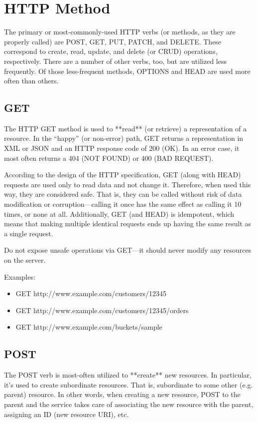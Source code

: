 \documentclass{report}
\begin{document}
	\section{HTTP Method}
	\par The primary or most-commonly-used HTTP verbs (or methods, as they are properly called) are POST, GET, PUT, PATCH, and DELETE. These correspond to create, read, update, and delete (or CRUD) operations, respectively. There are a number of other verbs, too, but are utilized less frequently. Of those less-frequent methods, OPTIONS and HEAD are used more often than others.
	\subsection{GET}
	\par 
	
	The HTTP GET method is used to **read** (or retrieve) a representation of a resource. In the “happy” (or non-error) path, GET returns a representation in XML or JSON and an HTTP response code of 200 (OK). In an error case, it most often returns a 404 (NOT FOUND) or 400 (BAD REQUEST).
	
	According to the design of the HTTP specification, GET (along with HEAD) requests are used only to read data and not change it. Therefore, when used this way, they are considered safe. That is, they can be called without risk of data modification or corruption—calling it once has the same effect as calling it 10 times, or none at all. Additionally, GET (and HEAD) is idempotent, which means that making multiple identical requests ends up having the same result as a single request.
	
	Do not expose unsafe operations via GET—it should never modify any resources on the server.
	
	Examples:
	\begin{itemize}
		\item GET http://www.example.com/customers/12345
		\item GET http://www.example.com/customers/12345/orders
		\item GET http://www.example.com/buckets/sample
	\end{itemize}	
	\subsection{POST}
	\par The POST verb is most-often utilized to **create** new resources. In particular, it's used to create subordinate resources. That is, subordinate to some other (e.g. parent) resource. In other words, when creating a new resource, POST to the parent and the service takes care of associating the new resource with the parent, assigning an ID (new resource URI), etc.
	
\end{document}
